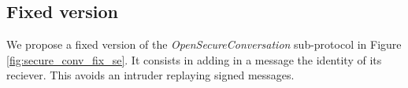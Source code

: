 %
%
%
%                
%                
%
%
%
%
%
%

\subsection{Fixed version}

We propose a fixed version of the {\em OpenSecureConversation} sub-protocol in
Figure \ref{fig:secure_conv_fix_se}.
It consists in adding in a message the identity of its reciever.
This avoids an intruder replaying signed messages.

